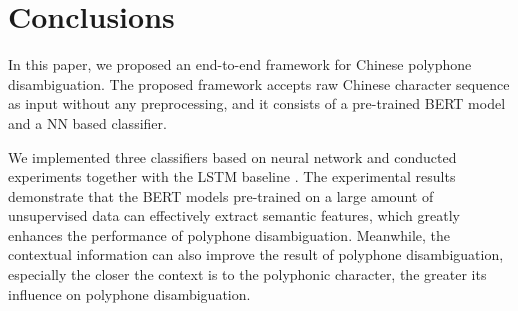 \documentclass[a4paper]{article}
\begin{document}
\section{Conclusions}

In this paper, we proposed an end-to-end framework for Chinese polyphone disambiguation. The proposed framework accepts raw Chinese character sequence as input without any preprocessing, and it consists of a pre-trained BERT model and a NN based classifier.

We implemented three classifiers based on neural network and conducted experiments together with the LSTM baseline \cite{shan2016bi}. The experimental results demonstrate that the BERT models pre-trained on a large amount of unsupervised data can effectively extract semantic features, which greatly enhances the performance of polyphone disambiguation. Meanwhile, the contextual information can also improve the result of polyphone disambiguation, especially the closer the context is to the polyphonic character, the greater its influence on polyphone disambiguation.






\end{document}

